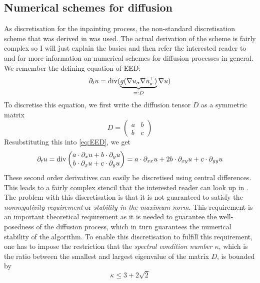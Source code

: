 \subsection{Numerical schemes for diffusion}
As discretisation for the inpainting process, the non-standard discretisation scheme that was
derived in \cite{www13} was used. The actual derivation of the scheme is fairly complex so I will
just explain the basics and then refer the interested reader to \cite{www13} and \cite{weickert96}
for more information on numerical schemes for diffusion processes in general.\\
We remember the defining equation of EED:
\begin{equation}
    \partial_t u = \operatorname{div}(\underbrace{g(\mathbf{\nabla} u_\sigma\mathbf{\nabla} u_\sigma^\top)}_{=:D}\mathbf{\nabla}
    u)\label{eq:EED}
\end{equation}
To discretise this equation, we first write the diffusion tensor $D$ as a symmetric matrix
\begin{equation}
    D = \begin{pmatrix}
        a&b\\b&c
    \end{pmatrix}
\end{equation}
Resubstituting this into \eqref{eq:EED}, we get 
\begin{equation}
\partial_t u = \operatorname{div} \begin{pmatrix}
    a\cdot \partial_x u+b\cdot \partial_y u\\
    b\cdot \partial_x u+c\cdot \partial_y u
\end{pmatrix} = a\cdot\partial_{xx} u + 2b\cdot \partial_{xy}u+ c\cdot \partial_{yy} u
\end{equation}
These second order derivatives can easily be discretised using central differences. This leads to a
fairly complex stencil that the interested reader can look up in \cite{weickert96}.
The problem with this discretisation is that it is not guaranteed to satisfy the
\textit{nonnegativity requirement} or \textit{stability in the maximum norm}\cite{weickert96}. This requirement is
an important theoretical requirement as it is needed to guarantee the well-posedness of the
diffusion process, which in turn guarantees the numerical stability of the algorithm. \cite{weickert96}
To enable this discretisation to fulfill this requirement, one has to impose the restriction that
the \textit{spectral condition number $\kappa$}, which is the ratio between the smallest and
largest eigenvalue of the matrix $D$, is bounded by 
\begin{equation}
    \kappa \leq 3 + 2\sqrt{2}
\end{equation}
